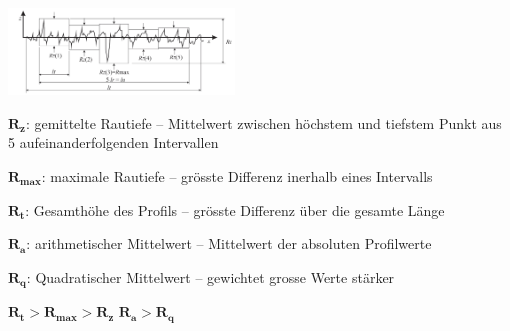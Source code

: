 
\includegraphics[width = 60mm]{src/images/rauheiten.png}
\item $\mathbf{R_{z}}$: gemittelte Rautiefe – Mittelwert zwischen höchstem und tiefstem Punkt aus 5 aufeinanderfolgenden Intervallen
\item $\mathbf{R_{max}}$: maximale Rautiefe – grösste Differenz inerhalb eines Intervalls
\item $\mathbf{R_{t}}$: Gesamthöhe des Profils – grösste Differenz über die gesamte Länge
\item $\mathbf{R_{a}}$: arithmetischer Mittelwert – Mittelwert der absoluten Profilwerte
\item $\mathbf{R_{q}}$: Quadratischer Mittelwert – gewichtet grosse Werte stärker
\begin{center}
    $\mathbf{R_{t} > R_{max} > R_{z}}$ \hspace{1cm}
    $\mathbf{R_{a} > R_{q}}$
\end{center}
